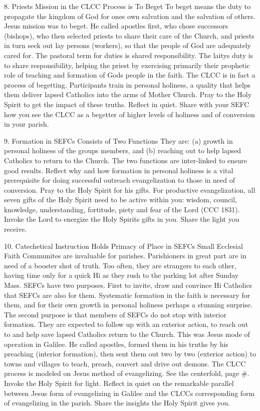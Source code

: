 \documentclass[oneside]{book}
\begin{document}
8. Priests Mission in the CLCC Process is To Beget To beget means the duty to
propagate the kingdom of God for ones own salvation and the salvation of
others. Jesus mission was to beget. He called apostles first, who chose
successors (bishops), who then selected priests to share their care of the
Church, and priests in turn seek out lay persons (workers), so that the people
of God are adequately cared for. The pastoral term for duties is shared
responsibility. The laitys duty is to share responsibility, helping the priest
by exercising primarily their prophetic role of teaching and formation of Gods
people in the faith. The CLCC is in fact a process of begetting. Participants
train in personal holiness, a quality that helps them deliver lapsed Catholics
into the arms of Mother Church.  Pray to the Holy Spirit to get the impact of
these truths. Reflect in quiet. Share with your SEFC how you see the CLCC as a
begetter of higher levels of holiness and of conversion in your parish.

9. Formation in SEFCs Consists of Two Functions They are: (a) growth in personal
holiness of the groups members, and (b) reaching out to help lapsed Catholics to
return to the Church.  The two functions are inter-linked to ensure good
results. Reflect why and how formation in personal holiness is a vital
prerequisite for doing successful outreach evangelization to those in need of
conversion. Pray to the Holy Spirit for his gifts. For productive
evangelization, all seven gifts of the Holy Spirit need to be active within you:
wisdom, council, knowledge, understanding, fortitude, piety and fear of the Lord
(CCC 1831). Invoke the Lord to energize the Holy Spirits gifts in you. Share the
light you receive.

10. Catechetical Instruction Holds Primacy of Place in SEFCs Small Ecclesial
Faith Communites are invaluable for parishes. Parishioners in great part are in
need of a booster shot of truth. Too often, they are strangers to each other,
having time only for a quick Hi as they rush to the parking lot after Sunday
Mass. SEFCs have two purposes. First to invite, draw and convince Hi Catholics
that SEFCs are also for them. Systematic formation in the faith is necessary for
them, and for their own growth in personal holiness perhaps a stunning
surprise. The second purpose is that members of SEFCs do not stop with interior
formation. They are expected to follow up with an exterior action, to reach out
to and help save lapsed Catholics return to the Church. This was Jesus mode of
operation in Galilee. He called apostles, formed them in his truths by his
preaching (interior formation), then sent them out two by two (exterior action)
to towns and villages to teach, preach, convert and drive out demons. The CLCC
process is modeled on Jesus method of evangelizing. See the centerfold, page
\#. Invoke the Holy Spirit for light. Reflect in quiet on the remarkable
parallel between Jesus form of evangelizing in Galilee and the CLCCs
corresponding form of evangelizing in the parish. Share the insights the Holy
Spirit gives you.
\end{document}
